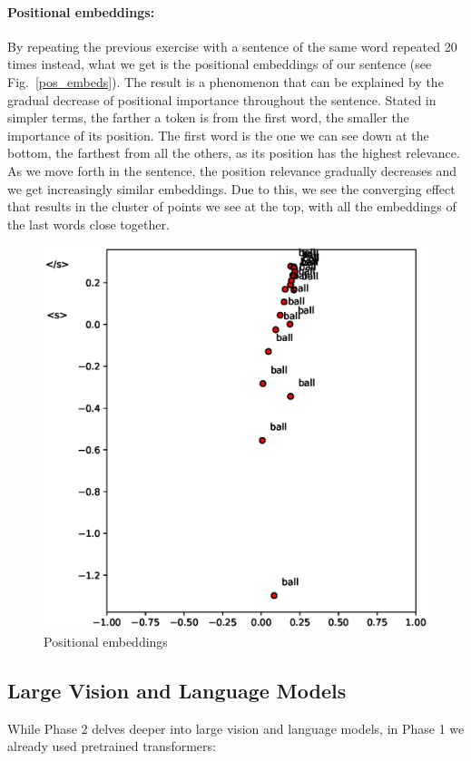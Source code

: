 \documentclass[runningheads]{llncs}
\begin{document}
\paragraph{Positional embeddings:}By repeating the previous exercise with a sentence of the same word repeated 20 times instead, what we get is the positional embeddings of our sentence (see Fig.~\ref{pos_embeds}). The result is a phenomenon that can be explained by the gradual decrease of positional importance throughout the sentence. Stated in simpler terms, the farther a token is from the first word, the smaller the importance of its position. The first word is the one we can see down at the bottom, the farthest from all the others, as its position has the highest relevance. As we move forth in the sentence, the position relevance gradually decreases and we get increasingly similar embeddings. Due to this, we see the converging effect that results in the cluster of points we see at the top, with all the embeddings of the last words close together.

\vspace{3\baselineskip plus 0.5\baselineskip minus 0.5\baselineskip} 

\begin{figure}[!htb]
  \centering
  \includegraphics[width=.5\textwidth, clip=true, trim = 15mm 0mm 0mm 0mm]{../figures/pos_embeds.eps}
  \caption{Positional embeddings}\label{pos_embeds}\label{img:positional_embeddings}
\end{figure}

\clearpage


\subsection{Large Vision and Language Models}
While Phase 2 delves deeper into large vision and language models, in Phase 1 we already used pretrained transformers:
\end{document}
